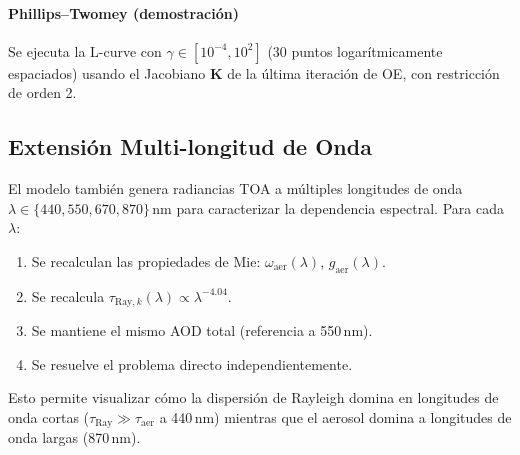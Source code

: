 \documentclass[a4paper,11pt]{article}
\begin{document}
\paragraph{Phillips--Twomey (demostraci\'on)}
Se ejecuta la L-curve con $\gamma \in [10^{-4}, 10^2]$ (30 puntos
logar\'itmicamente espaciados) usando el Jacobiano $\mathbf{K}$ de la
\'ultima iteraci\'on de OE, con restricci\'on de orden 2.

\subsection{Extensi\'on Multi-longitud de Onda}

El modelo tambi\'en genera radiancias TOA a m\'ultiples longitudes de onda
$\lambda \in \{440, 550, 670, 870\}$\,nm para caracterizar la dependencia
espectral. Para cada $\lambda$:
\begin{enumerate}
    \item Se recalculan las propiedades de Mie: $\omega_{\text{aer}}(\lambda)$,
          $g_{\text{aer}}(\lambda)$.
    \item Se recalcula $\tau_{\text{Ray},k}(\lambda) \propto \lambda^{-4.04}$.
    \item Se mantiene el mismo AOD total (referencia a 550\,nm).
    \item Se resuelve el problema directo independientemente.
\end{enumerate}

Esto permite visualizar c\'omo la dispersi\'on de Rayleigh domina en longitudes
de onda cortas ($\tau_{\text{Ray}} \gg \tau_{\text{aer}}$ a 440\,nm) mientras
que el aerosol domina a longitudes de onda largas (870\,nm).
\end{document}
